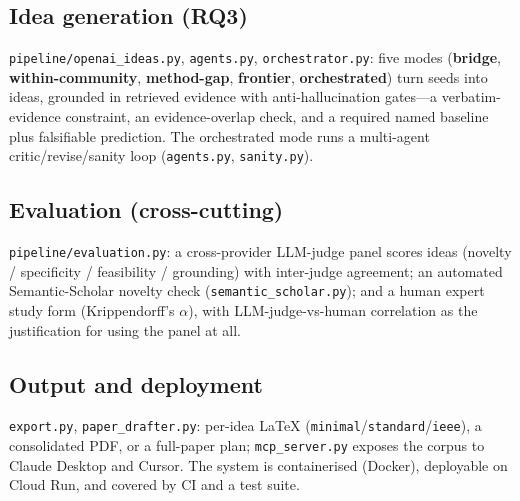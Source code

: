 \subsection{Idea generation (RQ3)}
\texttt{pipeline/openai\_ideas.py}, \texttt{agents.py}, \texttt{orchestrator.py}:
five modes (\textbf{bridge}, \textbf{within-community}, \textbf{method-gap},
\textbf{frontier}, \textbf{orchestrated}) turn seeds into ideas, grounded in
retrieved evidence with anti-hallucination gates---a verbatim-evidence
constraint, an evidence-overlap check, and a required named baseline plus
falsifiable prediction. The orchestrated mode runs a multi-agent
critic/revise/sanity loop (\texttt{agents.py}, \texttt{sanity.py}).

\subsection{Evaluation (cross-cutting)}
\texttt{pipeline/evaluation.py}: a cross-provider LLM-judge panel scores ideas
(novelty / specificity / feasibility / grounding) with inter-judge agreement; an
automated Semantic-Scholar novelty check (\texttt{semantic\_scholar.py}); and a
human expert study form (Krippendorff's $\alpha$), with LLM-judge-vs-human
correlation as the justification for using the panel at all.

\subsection{Output and deployment}
\texttt{export.py}, \texttt{paper\_drafter.py}: per-idea LaTeX
(\texttt{minimal}/\texttt{standard}/\texttt{ieee}), a consolidated PDF, or a
full-paper plan; \texttt{mcp\_server.py} exposes the corpus to Claude Desktop and
Cursor. The system is containerised (Docker), deployable on Cloud Run, and covered
by CI and a test suite.
